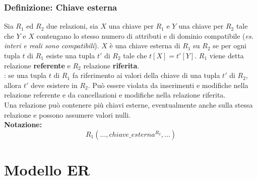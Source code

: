 \documentclass[12pt, a4paper]{report}
\begin{document}
            \subsection{Definizione: Chiave esterna}
                Sia $R_{1}$ ed $R_{2}$ due relazioni, sia $X$ una chiave per $R_{1}$ e $Y$ una chiave per $R_{2}$ tale che $Y$ e $X$ contengano lo stesso numero di attributi e di dominio compatibile (\textit{es. interi e reali sono compatibili}). $X$ è una chiave esterna di $R_{1}$ su $R_{2}$ se per ogni tupla $t$ di $R_{1}$ esiste una tupla $t'$ di $R_{2}$ tale che $t[X]=t'[Y]$. $R_{1}$ viene detta relazione \textbf{referente} e $R_{2}$ relazione \textbf{riferita}.\\
                : se una tupla $t$ di $R_{1}$ fa riferimento ai valori della chiave di una tupla $t'$ di $R_{2}$, allora $t'$ deve esistere in $R_{2}$. Può essere violata da inserimenti e modifiche nella relazione referente e da cancellazioni e modifiche nella relazione riferita.\\
                Una relazione può contenere più chiavi esterne, eventualmente anche sulla stessa relazione e possono assumere valori nulli.\\
                \textbf{Notazione:}
                \begin{equation*}
                    R_{1}\left(\dots,chiave\_esterna^{R_{2}},\dots\right)
                \end{equation*}
    \chapter{Modello ER}
\end{document}
